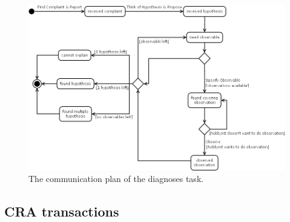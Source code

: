 \documentclass[a4paper,10pt]{article}
\begin{document}
\begin{figure}[htbp]
	\centering
		\includegraphics[width=1.00\textwidth]{communicationPlan.png}
	\caption{The communication plan of the diagnoses task.}
	\label{fig:communicationPlan}
\end{figure}



\subsection{CRA transactions}


\end{document}
